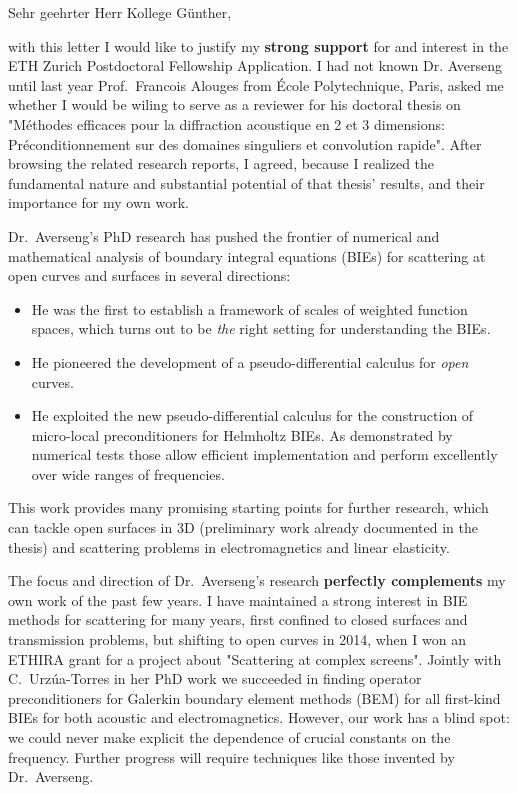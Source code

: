 \documentclass[english]{ethbrief3}
\begin{document}

\opening{Sehr geehrter Herr Kollege Günther,}

with this letter I would like to justify my \textbf{strong support} for and interest in
the ETH Zurich Postdoctoral Fellowship Application. I had not known Dr. Averseng until
last year Prof.~Francois Alouges from \'Ecole Polytechnique, Paris, asked me whether I
would be wiling to serve as a reviewer for his doctoral thesis on "Méthodes efficaces pour
la diffraction acoustique en 2 et 3 dimensions: Préconditionnement sur des domaines
singuliers et convolution rapide". After browsing the related research reports, I agreed,
because I realized the fundamental nature and substantial potential of that thesis'
results, and their importance for my own work.

Dr.~Averseng's PhD research has pushed the frontier of numerical and mathematical analysis
of boundary integral equations (BIEs) for scattering at open curves and surfaces in
several directions:
\begin{itemize}
\item He was the first to establish a framework of scales of weighted function spaces,
  which turns out to be \emph{the} right setting for understanding the BIEs.
\item He pioneered the development of a pseudo-differential calculus for \emph{open}
  curves.
\item He exploited the new pseudo-differential calculus for the construction of 
  micro-local preconditioners for Helmholtz BIEs. As demonstrated by numerical tests those
  allow efficient implementation and perform excellently over wide ranges of frequencies.
\end{itemize}
This work provides many promising starting points for further research, which can tackle open
surfaces in 3D (preliminary work already documented in the thesis) and scattering problems
in electromagnetics and linear elasticity.

The focus and direction of Dr.~Averseng's research \textbf{perfectly complements} my own
work of the past few years. I have maintained a strong interest in BIE methods for
scattering for many years, first confined to closed surfaces and transmission problems,
but shifting to open curves in 2014, when I won an ETHIRA grant for a project about
"Scattering at complex screens". Jointly with C.~Urz\'ua-Torres in her PhD work we
succeeded in finding operator preconditioners for Galerkin boundary element methods (BEM)
for all first-kind BIEs for both acoustic and electromagnetics. However, our work has a
blind spot: we could never make explicit the dependence of crucial constants on the
frequency. Further progress will require techniques like those invented by Dr.~Averseng.
\end{document}

